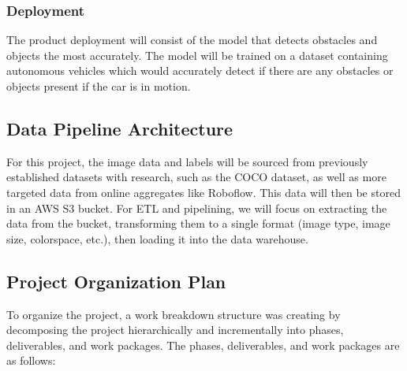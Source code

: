 \documentclass[stu,12pt,floatsintext]{apa7}
\begin{document}
\subsubsection{Deployment}
The product deployment will consist of the model that detects obstacles and objects the most accurately. The model will be trained on a dataset containing autonomous vehicles which would accurately detect if there are any obstacles or objects present if the car is in motion.


\subsection{Data Pipeline Architecture}

For this project, the image data and labels will be sourced from previously established datasets with research, such as the COCO dataset, as well as more targeted data from online aggregates like Roboflow. This data will then be stored in an AWS S3 bucket. For ETL and pipelining, we will focus on extracting the data from the bucket, transforming them to a single format (image type, image size, colorspace, etc.), then loading it into the data warehouse. 

\subsection{Project Organization Plan}
To organize the project, a work breakdown structure was creating by decomposing the project hierarchically and incrementally into phases, deliverables, and work packages. The phases, deliverables, and work packages are as follows:
\end{document}
